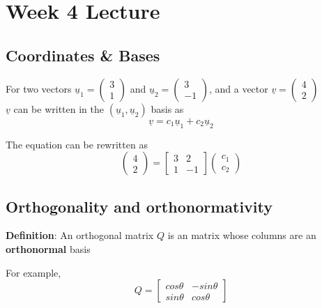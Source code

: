 \chapter{Week 4 Lecture}

\section{Coordinates \& Bases}

For two vectors $ \underline{u}_1 = \begin{pmatrix} 3 \\ 1 \end{pmatrix} $ and $ \underline{u}_2 = \begin{pmatrix} 3 \\ -1 \end{pmatrix} $, and a vector $ \underline{v} = \begin{pmatrix} 4 \\ 2 \end{pmatrix} $  \\

$ \underline{v} $ can be written in the $ \left( \underline{u}_1, \underline{u}_2 \right) $ basis as \[
  \underline{v} = c_1 \underline{u}_1 + c_2 \underline{u}_2
\] 

The equation can be rewritten as \[
   \begin{pmatrix} 4 \\ 2 \end{pmatrix}  = \begin{bmatrix} 3 & 2 \\ 1 & -1 \end{bmatrix} \begin{pmatrix} c_1 \\ c_2 \end{pmatrix} 
\]


\section{Orthogonality and orthonormativity}
\begin{framed}
\textbf{Definition}: An orthogonal matrix $Q$ is an matrix whose columns are an \textbf{orthonormal} basis
\end{framed}

For example, \[
  Q = \begin{bmatrix} 
     cos \theta & -sin \theta   \\
     sin \theta & cos \theta
  \end{bmatrix}
\] 

